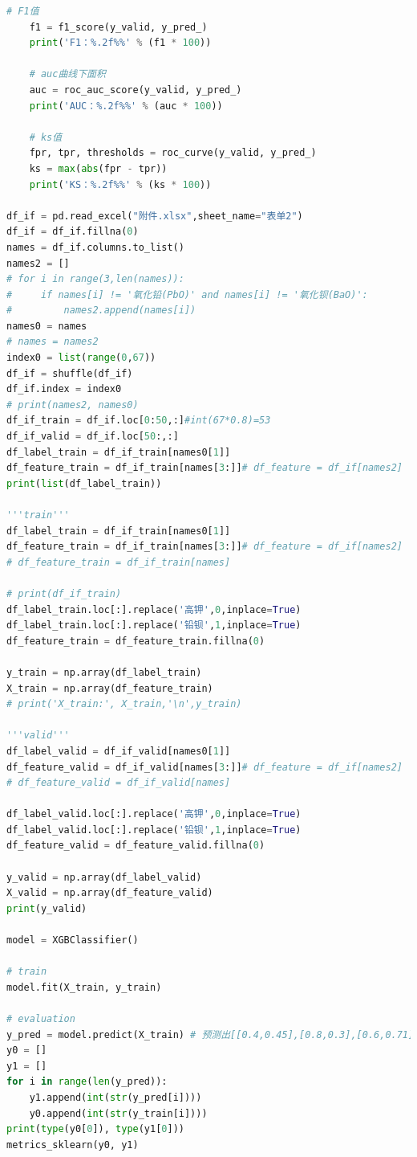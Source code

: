 \documentclass[withoutpreface,bwprint]{cumcmthesis} %
\begin{document}
\begin{appendices}
\begin{lstlisting}[language=Python]
    # F1值
    f1 = f1_score(y_valid, y_pred_)
    print('F1：%.2f%%' % (f1 * 100))

    # auc曲线下面积
    auc = roc_auc_score(y_valid, y_pred_)
    print('AUC：%.2f%%' % (auc * 100))

    # ks值
    fpr, tpr, thresholds = roc_curve(y_valid, y_pred_)
    ks = max(abs(fpr - tpr))
    print('KS：%.2f%%' % (ks * 100))

df_if = pd.read_excel("附件.xlsx",sheet_name="表单2")
df_if = df_if.fillna(0)
names = df_if.columns.to_list()
names2 = []
# for i in range(3,len(names)):
#     if names[i] != '氧化铅(PbO)' and names[i] != '氧化钡(BaO)':
#         names2.append(names[i])
names0 = names
# names = names2
index0 = list(range(0,67))
df_if = shuffle(df_if)  
df_if.index = index0
# print(names2, names0)
df_if_train = df_if.loc[0:50,:]#int(67*0.8)=53
df_if_valid = df_if.loc[50:,:]
df_label_train = df_if_train[names0[1]]
df_feature_train = df_if_train[names[3:]]# df_feature = df_if[names2]
print(list(df_label_train))

'''train'''
df_label_train = df_if_train[names0[1]]
df_feature_train = df_if_train[names[3:]]# df_feature = df_if[names2]
# df_feature_train = df_if_train[names]

# print(df_if_train)
df_label_train.loc[:].replace('高钾',0,inplace=True)
df_label_train.loc[:].replace('铅钡',1,inplace=True)
df_feature_train = df_feature_train.fillna(0)

y_train = np.array(df_label_train)
X_train = np.array(df_feature_train)
# print('X_train:', X_train,'\n',y_train)

'''valid'''
df_label_valid = df_if_valid[names0[1]]
df_feature_valid = df_if_valid[names[3:]]# df_feature = df_if[names2]
# df_feature_valid = df_if_valid[names]

df_label_valid.loc[:].replace('高钾',0,inplace=True)
df_label_valid.loc[:].replace('铅钡',1,inplace=True)
df_feature_valid = df_feature_valid.fillna(0)

y_valid = np.array(df_label_valid)
X_valid = np.array(df_feature_valid)
print(y_valid)

model = XGBClassifier()

# train
model.fit(X_train, y_train)

# evaluation
y_pred = model.predict(X_train) # 预测出[[0.4,0.45],[0.8,0.3],[0.6,0.71]]
y0 = []
y1 = []
for i in range(len(y_pred)):
    y1.append(int(str(y_pred[i])))
    y0.append(int(str(y_train[i])))
print(type(y0[0]), type(y1[0]))
metrics_sklearn(y0, y1)


\end{lstlisting}
\end{appendices}
\end{document}
